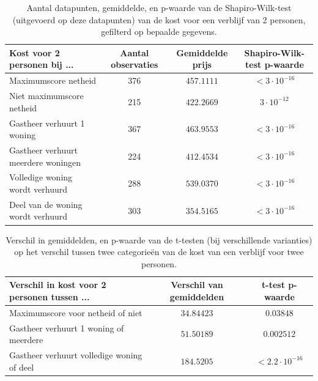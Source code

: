 \documentclass[a4paper]{kulakarticle}
\begin{document}
	\begin{table}
		\caption{Aantal datapunten, gemiddelde, en p-waarde van de Shapiro-Wilk-test (uitgevoerd op deze datapunten) van de kost voor een verblijf van 2 personen, gefilterd op bepaalde gegevens.}
		\label{tab:intermediary_results_gemiddelde_kost}
		\begin{tabular}{|l*{3}{|c}|}
			\hline
			Kost voor 2 personen bij ...        & Aantal observaties & Gemiddelde prijs & Shapiro-Wilk-test p-waarde \\ \hline
			\hline
			Maximumscore netheid                & 376    & $457.1111$ & $< 3 \cdot 10^{-16}$ \\ \hline
			Niet maximumscore netheid           & 215    & $422.2669$ & $ 3 \cdot 10^{-12}$ \\ \hline
			Gastheer verhuurt 1 woning          & 367    & $463.9553$ & $< 3 \cdot 10^{-16}$ \\ \hline
			Gastheer verhuurt meerdere woningen & 224    & $412.4534$ & $< 3 \cdot 10^{-16}$ \\ \hline
			Volledige woning wordt verhuurd     & 288    & $539.0370$ & $< 3 \cdot 10^{-16}$ \\ \hline
			Deel van de woning wordt verhuurd   & 303    & $354.5165$ & $< 3 \cdot 10^{-16}$ \\ \hline
		\end{tabular}
	\end{table}

	\begin{table}
		\caption{Verschil in gemiddelden, en p-waarde van de t-testen (bij verschillende varianties) op het verschil tussen twee categorieën van de kost van een verblijf voor twee personen.}
		\label{tab:end_results_gemiddelde_kost}
		\begin{tabular}{|l*{2}{|c}|}
			\hline
			Verschil in kost voor 2 personen tussen ...  & Verschil van gemiddelden
			& t-test p-waarde \\ \hline
			\hline
			
			Maximumscore voor netheid of niet                 & $34.84423$
			& $0.03848$              \\ \hline
			Gastheer verhuurt 1 woning of meerdere       & $51.50189$
			& $0.002512$             \\ \hline
			Gastheer verhuurt volledige woning of deel   & $184.5205$
			& $< 2.2 \cdot 10^{-16}$ \\ \hline
		\end{tabular}
	\end{table}
	
\end{document}
